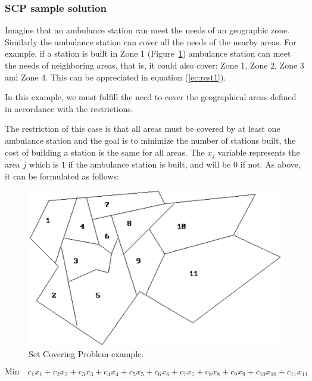 \subsubsection{SCP sample solution}\label{scpSampleSolution}
Imagine that an ambulance station can meet the needs of an geographic zone. Similarly the ambulance station can cover all the needs of the nearby areas. For example, if a station is built in Zone 1 (Figure~\ref{fig:SetCovering}) ambulance station can meet the needs of neighboring areas, that is, it could also cover: Zone 1, Zone 2, Zone 3 and Zone 4.  This can be appreciated in equation (\ref{ec:rest1}).

In this example, we must fulfill the need to cover the geographical areas defined in accordance with the restrictions.

The restriction of this case is that all areas must be covered by at least one ambulance station and the goal is to minimize the number of stations built, the cost of building a station is the same for all areas. The $x_j$ variable represents the area $j$ which is $1$ if the ambulance station is built, and will be $0$ if not. As above, it can be formulated as follows:

\squeezeup
\begin{figure}[!http]
	\begin{center}
		\includegraphics[scale=0.25]{Introduccion/imagenes/SetCovering.png} %
		\caption{Set Covering Problem example.}\label{fig:SetCovering}
	\end{center}
\end{figure}
\squeezeup


\scriptsize
\begin{equation} \label{ec:SetCoveringExample} 
\mbox{Min} \quad c_{1}x_{1} + c_{2}x_{2} + c_{3}x_{3} + c_{4}x_{4} + c_{5}x_{5} + c_{6}x_{6} + c_{7}x_{7} + c_{8}x_{8} + c_{9}x_{9} + c_{10}x_{10} + c_{11}x_{11}
\end{equation}

